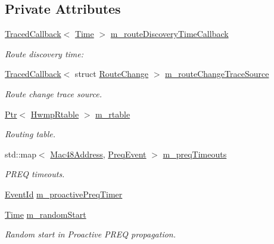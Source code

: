 \subsection*{Private Attributes}
\begin{DoxyCompactItemize}
\item 
\hyperlink{classns3_1_1TracedCallback}{Traced\+Callback}$<$ \hyperlink{classns3_1_1Time}{Time} $>$ \hyperlink{classns3_1_1dot11s_1_1HwmpProtocol_a748b1b4837d4ec8e76852a6c450d2f4e}{m\+\_\+route\+Discovery\+Time\+Callback}
\begin{DoxyCompactList}\small\item\em Route discovery time\+: \end{DoxyCompactList}\item 
\hyperlink{classns3_1_1TracedCallback}{Traced\+Callback}$<$ struct \hyperlink{structns3_1_1dot11s_1_1RouteChange}{Route\+Change} $>$ \hyperlink{classns3_1_1dot11s_1_1HwmpProtocol_aff5ca87b57430809a6b6ee25fa526948}{m\+\_\+route\+Change\+Trace\+Source}
\begin{DoxyCompactList}\small\item\em Route change trace source. \end{DoxyCompactList}\item 
\hyperlink{classns3_1_1Ptr}{Ptr}$<$ \hyperlink{classns3_1_1dot11s_1_1HwmpRtable}{Hwmp\+Rtable} $>$ \hyperlink{classns3_1_1dot11s_1_1HwmpProtocol_a12fda0e3e5a400888c8ba1a87c1a7216}{m\+\_\+rtable}
\begin{DoxyCompactList}\small\item\em Routing table. \end{DoxyCompactList}\item 
std\+::map$<$ \hyperlink{classns3_1_1Mac48Address}{Mac48\+Address}, \hyperlink{structns3_1_1dot11s_1_1HwmpProtocol_1_1PreqEvent}{Preq\+Event} $>$ \hyperlink{classns3_1_1dot11s_1_1HwmpProtocol_a8965b53a5ae63807e2bcf0faaa4a6dc2}{m\+\_\+preq\+Timeouts}
\begin{DoxyCompactList}\small\item\em P\+R\+EQ timeouts. \end{DoxyCompactList}\item 
\hyperlink{classns3_1_1EventId}{Event\+Id} \hyperlink{classns3_1_1dot11s_1_1HwmpProtocol_a9788adc340b2abf12aae651c911bd74f}{m\+\_\+proactive\+Preq\+Timer}
\item 
\hyperlink{classns3_1_1Time}{Time} \hyperlink{classns3_1_1dot11s_1_1HwmpProtocol_a5ed9a6e3777b69a28f32eeebfc68c9ea}{m\+\_\+random\+Start}
\begin{DoxyCompactList}\small\item\em Random start in Proactive P\+R\+EQ propagation. \end{DoxyCompactList}\item 

\end{DoxyCompactItemize}
